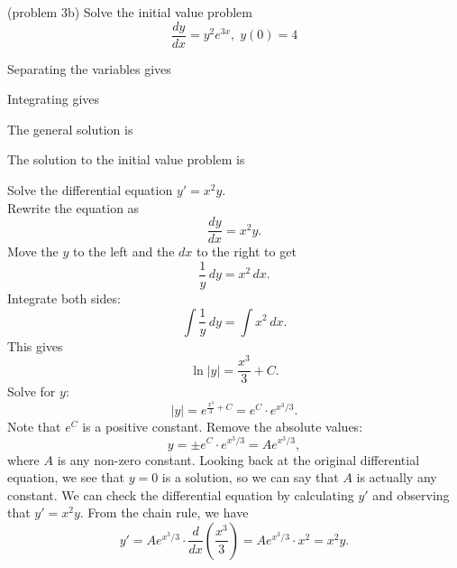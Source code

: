 \documentclass[handout]{ximera}
\begin{document}
\begin{problem}(problem 3b)
Solve the initial value problem
\[
\frac{dy}{dx} = y^2e^{3x}, \; y(0) = 4
\]

Separating the variables gives

\begin{multipleChoice}
\end{multipleChoice}

Integrating gives

\begin{multipleChoice}
\end{multipleChoice}

The general solution is

\begin{multipleChoice}
\end{multipleChoice}

The solution to the initial value problem is

\begin{multipleChoice}
\end{multipleChoice}

\end{problem}






\begin{example}[example 4]
Solve the differential equation $y' = x^2y$.\\
Rewrite the equation as 
\[
\frac{dy}{dx} = x^2y.
\]
Move the $y$ to the left and the $dx$ to the right to get
\[
\frac{1}{y} \, dy = x^2 \,  dx.
\]
Integrate both sides:
\[
\int \frac{1}{y}\,  dy  = \int x^2 \, dx.
\]
This gives
\[
\ln|y| = \frac{x^3}{3} + C.
\]
Solve for $y$:
\[
|y| = e^{\frac{x^3}{3} + C} = e^C \cdot e^{x^3/3}.
\]
Note that $e^C$ is a positive constant. Remove the absolute values:
\[
y = \pm e^C \cdot e^{x^3/3} = Ae^{x^3/3},
\]
where $A$ is any non-zero constant. Looking back at the original differential equation, we see that $y = 0$ is a solution, so 
we can say that $A$ is actually any constant.
We can check the differential equation by calculating $y'$ and observing that $y' = x^2y$.
From the chain rule, we have
\[
y' = Ae^{x^3/3}\cdot \frac{d}{dx} \left(\frac{x^3}{3}\right) = Ae^{x^3/3} \cdot x^2 = x^2 y.
\]

\end{example}
\end{document}
